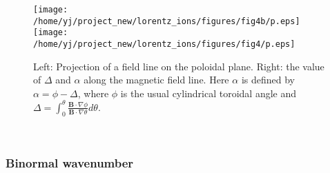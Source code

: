 \documentclass{llncs}
\begin{document}
\begin{figure}[h]
  \texttt{[image: /home/yj/project\_new/lorentz\_ions/figures/fig4b/p.eps]}\texttt{[image: /home/yj/project\_new/lorentz\_ions/figures/fig4/p.eps]}
  \caption{\label{17-10-2-p1}Left: Projection of a field line on the poloidal
  plane. Right: the value of $\Delta$ and $\alpha$ along the magnetic field
  line. Here $\alpha$ is defined by $\alpha = \phi - \Delta$, where $\phi$ is
  the usual cylindrical toroidal angle and $\Delta = \int_0^{\theta}
  \frac{\mathbf{B} \cdot \nabla \phi}{\mathbf{B} \cdot \nabla \theta} d
  \theta$.}
\end{figure}

\

\subsubsection{Binormal wavenumber}
\end{document}
